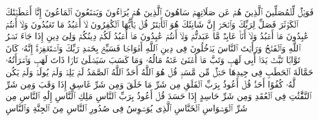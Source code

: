 \startbuffer[\q:107:4]
فَوَیۡلࣱ لِّلۡمُصَلِّینَ%
\stopbuffer%
\startbuffer[\q:107:5]
ٱلَّذِینَ هُمۡ عَن صَلَاتِهِمۡ سَاهُونَ%
\stopbuffer%
\startbuffer[\q:107:6]
ٱلَّذِینَ هُمۡ یُرَاۤءُونَ%
\stopbuffer%
\startbuffer[\q:107:7]
وَیَمۡنَعُونَ ٱلۡمَاعُونَ%
\stopbuffer%
\startbuffer[\q:108:1]
إِنَّاۤ أَعۡطَیۡنَٰكَ ٱلۡكَوۡثَرَ%
\stopbuffer%
\startbuffer[\q:108:2]
فَصَلِّ لِرَبِّكَ وَٱنۡحَرۡ%
\stopbuffer%
\startbuffer[\q:108:3]
إِنَّ شَانِئَكَ هُوَ ٱلۡأَبۡتَرُ%
\stopbuffer%
\startbuffer[\q:109:1]
قُلۡ یَٰۤأَیُّهَا ٱلۡكَٰفِرُونَ%
\stopbuffer%
\startbuffer[\q:109:2]
لَاۤ أَعۡبُدُ مَا تَعۡبُدُونَ%
\stopbuffer%
\startbuffer[\q:109:3]
وَلَاۤ أَنتُمۡ عَٰبِدُونَ مَاۤ أَعۡبُدُ%
\stopbuffer%
\startbuffer[\q:109:4]
وَلَاۤ أَنَا۠ عَابِدࣱ مَّا عَبَدتُّمۡ%
\stopbuffer%
\startbuffer[\q:109:5]
وَلَاۤ أَنتُمۡ عَٰبِدُونَ مَاۤ أَعۡبُدُ%
\stopbuffer%
\startbuffer[\q:109:6]
لَكُمۡ دِینُكُمۡ وَلِیَ دِینِ%
\stopbuffer%
\startbuffer[\q:110:1]
إِذَا جَاۤءَ نَصۡرُ ٱللَّهِ وَٱلۡفَتۡحُ%
\stopbuffer%
\startbuffer[\q:110:2]
وَرَأَیۡتَ ٱلنَّاسَ یَدۡخُلُونَ فِی دِینِ ٱللَّهِ أَفۡوَاجࣰا%
\stopbuffer%
\startbuffer[\q:110:3]
فَسَبِّحۡ بِحَمۡدِ رَبِّكَ وَٱسۡتَغۡفِرۡهُۚ إِنَّهُۥ كَانَ تَوَّابَۢا%
\stopbuffer%
\startbuffer[\q:111:1]
تَبَّتۡ یَدَاۤ أَبِی لَهَبࣲ وَتَبَّ%
\stopbuffer%
\startbuffer[\q:111:2]
مَاۤ أَغۡنَىٰ عَنۡهُ مَالُهُۥ وَمَا كَسَبَ%
\stopbuffer%
\startbuffer[\q:111:3]
سَیَصۡلَىٰ نَارࣰا ذَاتَ لَهَبࣲ%
\stopbuffer%
\startbuffer[\q:111:4]
وَٱمۡرَأَتُهُۥ حَمَّالَةَ ٱلۡحَطَبِ%
\stopbuffer%
\startbuffer[\q:111:5]
فِی جِیدِهَا حَبۡلࣱ مِّن مَّسَدِۭ%
\stopbuffer%
\startbuffer[\q:112:1]
قُلۡ هُوَ ٱللَّهُ أَحَدٌ%
\stopbuffer%
\startbuffer[\q:112:2]
ٱللَّهُ ٱلصَّمَدُ%
\stopbuffer%
\startbuffer[\q:112:3]
لَمۡ یَلِدۡ وَلَمۡ یُولَدۡ%
\stopbuffer%
\startbuffer[\q:112:4]
وَلَمۡ یَكُن لَّهُۥ كُفُوًا أَحَدُۢ%
\stopbuffer%
\startbuffer[\q:113:1]
قُلۡ أَعُوذُ بِرَبِّ ٱلۡفَلَقِ%
\stopbuffer%
\startbuffer[\q:113:2]
مِن شَرِّ مَا خَلَقَ%
\stopbuffer%
\startbuffer[\q:113:3]
وَمِن شَرِّ غَاسِقٍ إِذَا وَقَبَ%
\stopbuffer%
\startbuffer[\q:113:4]
وَمِن شَرِّ ٱلنَّفَّٰثَٰتِ فِی ٱلۡعُقَدِ%
\stopbuffer%
\startbuffer[\q:113:5]
وَمِن شَرِّ حَاسِدٍ إِذَا حَسَدَ%
\stopbuffer%
\startbuffer[\q:114:1]
قُلۡ أَعُوذُ بِرَبِّ ٱلنَّاسِ%
\stopbuffer%
\startbuffer[\q:114:2]
مَلِكِ ٱلنَّاسِ%
\stopbuffer%
\startbuffer[\q:114:3]
إِلَٰهِ ٱلنَّاسِ%
\stopbuffer%
\startbuffer[\q:114:4]
مِن شَرِّ ٱلۡوَسۡوَاسِ ٱلۡخَنَّاسِ%
\stopbuffer%
\startbuffer[\q:114:5]
ٱلَّذِی یُوَسۡوِسُ فِی صُدُورِ ٱلنَّاسِ%
\stopbuffer%
\startbuffer[\q:114:6]
مِنَ ٱلۡجِنَّةِ وَٱلنَّاسِ%
\stopbuffer%
